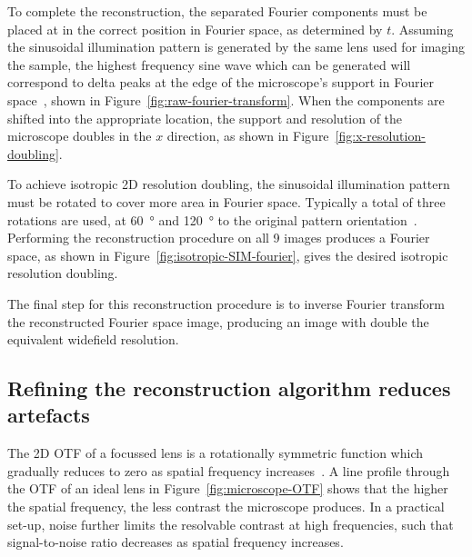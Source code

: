 To complete the reconstruction, the separated Fourier components must be placed at in the correct position in Fourier space, as determined by $t$. 
Assuming the sinusoidal illumination pattern is generated by the same lens used for imaging the sample, the highest frequency sine wave which can be generated will correspond to delta peaks at the edge of the microscope's support in Fourier space~\cite{heintzmann2017super}, shown in Figure~\ref{fig:raw-fourier-transform}. 
When the components are shifted into the appropriate location, the support and resolution of the microscope doubles in the $x$ direction, as shown in Figure~\ref{fig:x-resolution-doubling}. 

To achieve isotropic 2D resolution doubling, the sinusoidal illumination pattern must be rotated to cover more area in Fourier space. 
Typically a total of three rotations are used, at \SI{60}{\degree} and \SI{120}{\degree} to the original pattern orientation~\cite{gustafsson2000surpassing, chang2009isotropic}. 
Performing the reconstruction procedure on all 9 images produces a Fourier space, as shown in Figure~\ref{fig:isotropic-SIM-fourier}, gives the desired isotropic resolution doubling. 

The final step for this reconstruction procedure is to inverse Fourier transform the reconstructed Fourier space image, producing an image with double the equivalent widefield resolution. 


\subsection{Refining the reconstruction algorithm reduces artefacts}
The 2D OTF of a focussed lens is a rotationally symmetric function which gradually reduces to zero as spatial frequency increases~\cite{williams2002introduction}. 
A line profile through the OTF of an ideal lens in Figure~\ref{fig:microscope-OTF} shows that the higher the spatial frequency, the less contrast the microscope produces.
In a practical set-up, noise further limits the resolvable contrast at high frequencies, such that signal-to-noise ratio decreases as spatial frequency increases. 

